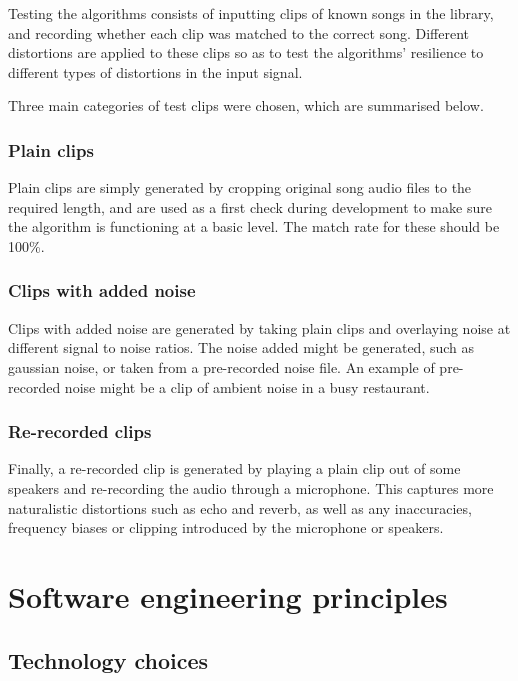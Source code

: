 \documentclass[12pt,a4paper,twoside,openright]{report}
\begin{document}
Testing the algorithms consists of inputting clips of known songs in the library, and recording whether each clip was matched to the correct song. Different distortions are applied to these clips so as to test the algorithms' resilience to different types of distortions in the input signal.

Three main categories of test clips were chosen, which are summarised below.

\subsubsection{Plain clips}

Plain clips are simply generated by cropping original song audio files to the required length, and are used as a first check during development to make sure the algorithm is functioning at a basic level. The match rate for these should be 100\%.

\subsubsection{Clips with added noise}

Clips with added noise are generated by taking plain clips and overlaying noise at different signal to noise ratios. The noise added might be generated, such as gaussian noise, or taken from a pre-recorded noise file. An example of pre-recorded noise might be a clip of ambient noise in a busy restaurant.

\subsubsection{Re-recorded clips}

Finally, a re-recorded clip is generated by playing a plain clip out of some speakers and re-recording the audio through a microphone. This captures more naturalistic distortions such as echo and reverb, as well as any inaccuracies, frequency biases or clipping introduced by the microphone or speakers.


\section{Software engineering principles}

\subsection{Technology choices}
\end{document}
